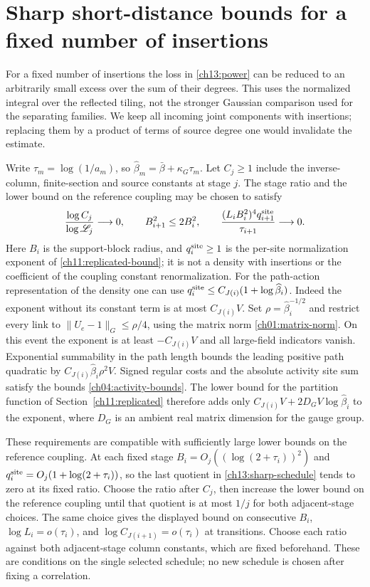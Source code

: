\section{Sharp short-distance bounds for a fixed number of insertions}
\label{ch13:sharp-section}

For a fixed number of insertions the loss in
\eqref{ch13:power} can be reduced to an arbitrarily small excess over
the sum of their degrees. This uses the normalized integral over the reflected tiling,
not the stronger Gaussian comparison used for the separating families. We keep
all incoming joint components with insertions; replacing them by a product of
terms of source degree one would invalidate the estimate.

Write $\tau_m=\log(1/a_m)$, so
$\widehat\beta_m=\bar\beta+\kappa_G\tau_m$. Let $C_j\ge1$ include
the inverse-column, finite-section and source constants at stage $j$.
The stage ratio and the lower bound on the reference coupling may be chosen to satisfy
\begin{equation}
 \frac{\log C_j}{\log \mathscr L_j}\longrightarrow0,\qquad
 B_{i+1}^2\le2B_i^2,\qquad
 \frac{(L_iB_i^2)^4 q_{i+1}^{\rm site}}{\tau_{i+1}}
                          \longrightarrow0.
 \label{ch13:sharp-schedule}
\end{equation}
Here $B_i$ is the support-block radius, and $q_i^{\rm site}\ge1$ is
the per-site normalization exponent of \eqref{ch11:replicated-bound};
it is not a density with insertions or the coefficient of the coupling constant renormalization.
For the path-action representation of the density one can use
$q_i^{\rm site}\le C_{J(i)}(1+\log\widehat\beta_i)$.
Indeed the exponent without its constant term is at most $C_{J(i)}V$. Set
$\rho=\widehat\beta_i^{-1/2}$ and restrict every link to
$\|U_e-1\|_G\le\rho/4$, using the matrix norm \eqref{ch01:matrix-norm}.
On this event the exponent is at least $-C_{J(i)}V$ and all large-field
indicators vanish. Exponential summability in the path length bounds the
leading positive path quadratic by $C_{J(i)}\widehat\beta_i\rho^2V$.
Signed regular costs and the absolute
activity site sum satisfy the bounds \eqref{ch04:activity-bounds}. The lower bound for the partition function
of Section~\ref{ch11:replicated} therefore adds only
$C_{J(i)}V+2D_GV\log\widehat\beta_i$ to the exponent, where $D_G$ is an ambient
real matrix dimension for the gauge group.

These requirements are compatible with sufficiently large lower bounds on the reference coupling. At each fixed
stage $B_i=O_j((\log(2+\tau_i))^2)$ and
$q_i^{\rm site}=O_j(1+\log(2+\tau_i))$, so the last quotient in
\eqref{ch13:sharp-schedule} tends to zero at its fixed ratio. Choose
the ratio after $C_j$, then increase the lower bound on the reference coupling until that quotient is at
most $1/j$ for both adjacent-stage choices. The same choice gives
the displayed bound on consecutive $B_i$,
$\log L_i=o(\tau_i)$, and $\log C_{J(i+1)}=o(\tau_i)$
at transitions. Choose each ratio against both adjacent-stage column
constants, which are fixed beforehand. These are conditions on the single selected
schedule; no new schedule is chosen after fixing a correlation.

